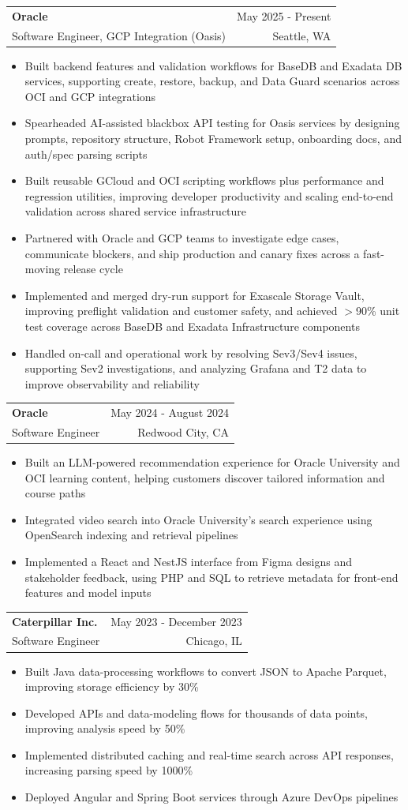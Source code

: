 \documentclass[letterpaper,11pt]{article}
\makeatletter
\newcommand{\resumeItem}[1]{
  \item\small{
    {#1 \vspace{-2pt}}
  }
}
\newcommand{\resumeSubheading}[4]{
  \vspace{-2pt}\item
    \begin{tabular*}{0.97\textwidth}[t]{l@{\extracolsep{\fill}}r}
      \textbf{#1} & #2 \\
      {\small#3} & {\small #4} \\
    \end{tabular*}\vspace{-7pt}
}
\newcommand{\resumeItemListStart}{\begin{itemize}}
\newcommand{\resumeItemListEnd}{\end{itemize}\vspace{-5pt}}
\makeatother
\begin{document}
    \resumeSubheading
  {Oracle}{May 2025 - Present}
  {Software Engineer, GCP Integration (Oasis)}{Seattle, WA}
  \resumeItemListStart
    \resumeItem{Built backend features and validation workflows for BaseDB and Exadata DB services, supporting create, restore, backup, and Data Guard scenarios across OCI and GCP integrations}
    \resumeItem{Spearheaded AI-assisted blackbox API testing for Oasis services by designing prompts, repository structure, Robot Framework setup, onboarding docs, and auth/spec parsing scripts}
    \resumeItem{Built reusable GCloud and OCI scripting workflows plus performance and regression utilities, improving developer productivity and scaling end-to-end validation across shared service infrastructure}
    \resumeItem{Partnered with Oracle and GCP teams to investigate edge cases, communicate blockers, and ship production and canary fixes across a fast-moving release cycle}
    \resumeItem{Implemented and merged dry-run support for Exascale Storage Vault, improving preflight validation and customer safety, and achieved $>$90\% unit test coverage across BaseDB and Exadata Infrastructure components}
    \resumeItem{Handled on-call and operational work by resolving Sev3/Sev4 issues, supporting Sev2 investigations, and analyzing Grafana and T2 data to improve observability and reliability}
  \resumeItemListEnd

    \resumeSubheading
      {Oracle}{May 2024 - August 2024}
      {Software Engineer}{Redwood City, CA}
      \resumeItemListStart
        \resumeItem{Built an LLM-powered recommendation experience for Oracle University and OCI learning content, helping customers discover tailored information and course paths}
        \resumeItem{Integrated video search into Oracle University's search experience using OpenSearch indexing and retrieval pipelines}
        \resumeItem{Implemented a React and NestJS interface from Figma designs and stakeholder feedback, using PHP and SQL to retrieve metadata for front-end features and model inputs}
      \resumeItemListEnd

    \resumeSubheading
      {Caterpillar Inc.}{May 2023 - December 2023}
      {Software Engineer}{Chicago, IL}
      \resumeItemListStart
        \resumeItem{Built Java data-processing workflows to convert JSON to Apache Parquet, improving storage efficiency by 30\%}
        \resumeItem{Developed APIs and data-modeling flows for thousands of data points, improving analysis speed by 50\%}
        \resumeItem{Implemented distributed caching and real-time search across API responses, increasing parsing speed by 1000\%}
        \resumeItem{Deployed Angular and Spring Boot services through Azure DevOps pipelines}
      \resumeItemListEnd
\end{document}
